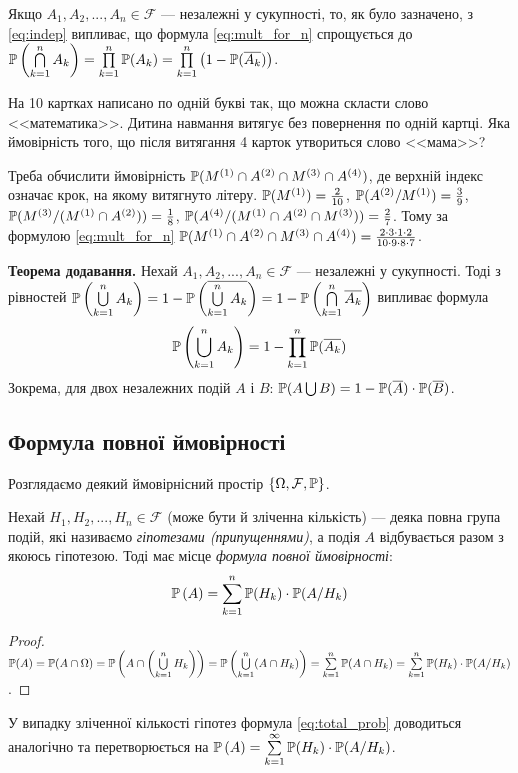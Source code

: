 Якщо $A_1, A_2, ..., A_n \in \mathcal{F}$ --- незалежні у сукупності, то, як було зазначено, з \eqref{eq:indep} випливає, що
формула \eqref{eq:mult_for_n} спрощується до $\P\left(\bigcap\limits_{k=1}^n A_k\right) = \prod\limits_{k=1}^n \P(A_k) = \prod\limits_{k=1}^n \left(1-\P(\overline{A_k})\right)$.

\begin{example}
    На 10 картках написано по одній букві так, що можна скласти слово <<математика>>.
    Дитина навмання витягує без повернення по одній картці. Яка ймовірність того, що після витягання 4 карток
    утвориться слово <<мама>>?

    Треба обчислити ймовірність $\P(M^{(1)} \cap A^{(2)} \cap M^{(3)} \cap A^{(4)})$,
    де верхній індекс означає крок, на якому витягнуто літеру.
    $\P(M^{(1)}) = \frac{2}{10}$, $\P(A^{(2)} / M^{(1)}) = \frac{3}{9}$,
    $\P(M^{(3)}/(M^{(1)} \cap A^{(2)})) = \frac{1}{8}$, $\P(A^{(4)} / (M^{(1)} \cap A^{(2)} \cap M^{(3)})) = \frac{2}{7}$.
    Тому за формулою \eqref{eq:mult_for_n} $\P(M^{(1)} \cap A^{(2)} \cap M^{(3)} \cap A^{(4)}) = \frac{2 \cdot 3 \cdot 1 \cdot 2}{10 \cdot 9 \cdot 8 \cdot 7}$.
\end{example}

\noindent\textbf{Теорема додавання.} Нехай $A_1, A_2, ..., A_n \in \mathcal{F}$ --- незалежні у сукупності.
Тоді з рівностей $\P\left(\bigcup\limits_{k=1}^n A_k\right) = 1 - \P\left(\overline{\bigcup\limits_{k=1}^n A_k}\right) = 1 - \P\left(\bigcap\limits_{k=1}^n \overline{A_k}\right)$
випливає формула
\begin{equation}
    \P\left(\bigcup\limits_{k=1}^n A_k\right) = 1 - \prod\limits_{k=1}^n \P(\overline{A_k})
\end{equation}
Зокрема, для двох незалежних подій $A$ і $B$: $\P(A\bigcup B) = 1 - \P(\overline{A}) \cdot \P(\overline{B})$.

\subsection{Формула повної ймовірності}
Розглядаємо деякий ймовірнісний простір $\left\{ \Omega, \mathcal{F}, \P\right\}$.

Нехай $H_1, H_2, ..., H_n \in \mathcal{F}$ (може бути й зліченна кількість) --- деяка повна група подій,
які називаємо \emph{гіпотезами (припущеннями)}, а подія $A$ відбувається разом з якоюсь гіпотезою. Тоді має місце
\emph{формула повної ймовірності}:
\begin{equation}\label{eq:total_prob}
    \P\left( A \right) = \sum\limits_{k=1}^n \P(H_k)\cdot \P(A/H_k)
\end{equation}
\begin{proof}
    $\P(A) = \P(A \cap \Omega) = \P\left(A \cap \left(\bigcup\limits_{k=1}^n H_k\right)\right) = \P\left(\bigcup\limits_{k=1}^n (A\cap H_k)\right) = \sum\limits_{k=1}^n \P(A\cap H_k) = \sum\limits_{k=1}^n \P(H_k)\cdot \P(A/H_k)$.
\end{proof}
У випадку зліченної кількості гіпотез формула \eqref{eq:total_prob} доводиться аналогічно та перетворюється
на $\P\left( A \right) = \sum\limits_{k=1}^{\infty} \P(H_k)\cdot \P(A/H_k)$.

